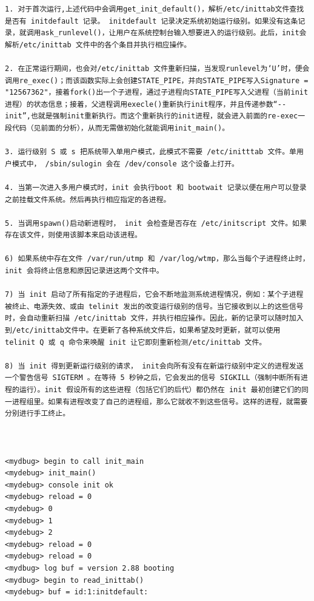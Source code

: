 {\begin{shaded}\begin{verbatim}
1. 对于首次运行,上述代码中会调用get_init_default()，解析/etc/inittab文件查找是否有 initdefault 记录。 initdefault 记录决定系统初始运行级别。如果没有这条记录，就调用ask_runlevel()，让用户在系统控制台输入想要进入的运行级别。此后，init会解析/etc/inittab 文件中的各个条目并执行相应操作。

2. 在正常运行期间，也会对/etc/inittab 文件重新扫描，当发现runlevel为‘U’时，便会调用re_exec()；而该函数实际上会创建STATE_PIPE，并向STATE_PIPE写入Signature = "12567362"，接着fork()出一个子进程，通过子进程向STATE_PIPE写入父进程（当前init进程）的状态信息；接着，父进程调用execle()重新执行init程序，并且传递参数“--init”,也就是强制init重新执行。而这个重新执行的init进程，就会进入前面的re-exec一段代码（见前面的分析），从而无需做初始化就能调用init_main()。

3. 运行级别 S 或 s 把系统带入单用户模式，此模式不需要 /etc/initttab 文件。单用户模式中， /sbin/sulogin 会在 /dev/console 这个设备上打开。

4. 当第一次进入多用户模式时，init 会执行boot 和 bootwait 记录以便在用户可以登录之前挂载文件系统。然后再执行相应指定的各进程。

5. 当调用spawn()启动新进程时， init 会检查是否存在 /etc/initscript 文件。如果存在该文件，则使用该脚本来启动该进程。

6) 如果系统中存在文件 /var/run/utmp 和 /var/log/wtmp，那么当每个子进程终止时，init 会将终止信息和原因记录进这两个文件中。

7) 当 init 启动了所有指定的子进程后，它会不断地监测系统进程情况，例如：某个子进程被终止、电源失效、或由 telinit 发出的改变运行级别的信号。当它接收到以上的这些信号时，会自动重新扫描 /etc/inittab 文件，并执行相应操作。因此，新的记录可以随时加入到/etc/inittab文件中。在更新了各种系统文件后，如果希望及时更新，就可以使用telinit Q 或 q 命令来唤醒 init 让它即刻重新检测/etc/inittab 文件。

8) 当 init 得到更新运行级别的请求， init会向所有没有在新运行级别中定义的进程发送一个警告信号 SIGTERM 。在等待 5 秒钟之后，它会发出的信号 SIGKILL（强制中断所有进程的运行）。init 假设所有的这些进程（包括它们的后代）都仍然在 init 最初创建它们的同一进程组里。如果有进程改变了自己的进程组，那么它就收不到这些信号。这样的进程，就需要分别进行手工终止。



<mydbug> begin to call init_main
<mydebug> init_main()
<mydebug> console init ok
<mydebug> reload = 0 
<mydebug> 0 
<mydebug> 1 
<mydebug> 2 
<mydebug> reload = 0 
<mydebug> reload = 0 
<mydbug> log buf = version 2.88 booting
<mydbug> begin to read_inittab()
<mydebug> buf = id:1:initdefault:


\end{verbatim}
\end{shaded}}
